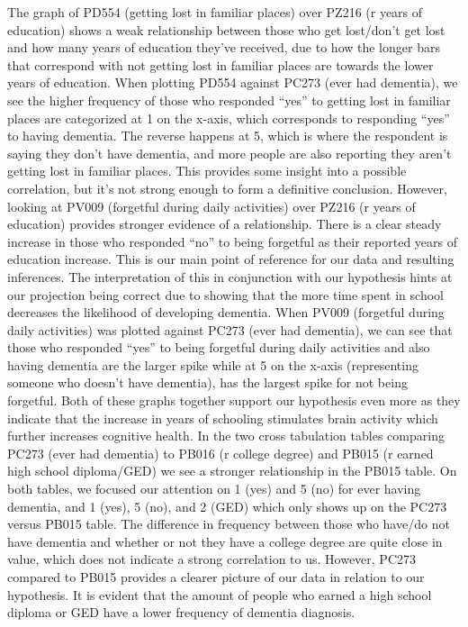 \documentclass{article}
\begin{document}
\hspace*{1em} The graph of PD554 (getting lost in familiar places) over PZ216 (r years of education) shows a weak relationship between those who get lost/don’t get lost and how many years of education they’ve received, due to how the longer bars that correspond with not getting lost in familiar places are towards the lower years of education. When plotting PD554 against PC273 (ever had dementia), we see the higher frequency of those who responded “yes” to getting lost in familiar places are categorized at 1 on the x-axis, which corresponds to responding “yes” to having dementia. The reverse happens at 5, which is where the respondent is saying they don’t have dementia, and more people are also reporting they aren’t getting lost in familiar places. This provides some insight into a possible correlation, but it’s not strong enough to form a definitive conclusion. However, looking at PV009 (forgetful during daily activities) over PZ216 (r years of education) provides stronger evidence of a relationship. There is a clear steady increase in those who responded “no” to being forgetful as their reported years of education increase. This is our main point of reference for our data and resulting inferences. The interpretation of this in conjunction with our hypothesis hints at our projection being correct due to showing that the more time spent in school decreases the likelihood of developing dementia. When PV009 (forgetful during daily activities) was plotted against PC273 (ever had dementia), we can see that those who responded “yes” to being forgetful during daily activities and also having dementia are the larger spike while at 5 on the x-axis (representing someone who doesn’t have dementia), has the largest spike for not being forgetful. Both of these graphs together support our hypothesis even more as they indicate that the increase in years of schooling stimulates brain activity which further increases cognitive health. In the two cross tabulation tables comparing PC273 (ever had dementia) to PB016 (r college degree) and PB015 (r earned high school diploma/GED) we see a stronger relationship in the PB015 table. On both tables, we focused our attention on 1 (yes) and 5 (no) for ever having dementia, and 1 (yes), 5 (no), and 2 (GED) which only shows up on the PC273 versus PB015 table. The difference in frequency between those who have/do not have dementia and whether or not they have a college degree are quite close in value, which does not indicate a strong correlation to us. However, PC273 compared to PB015 provides a clearer picture of our data in relation to our hypothesis. It is evident that the amount of people who earned a high school diploma or GED have a lower frequency of dementia diagnosis. 
\end{document}

